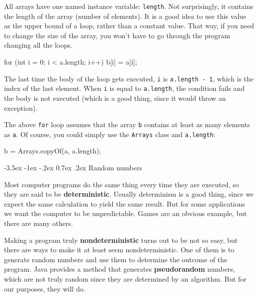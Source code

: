 \documentclass[12pt]{book}
\makeatletter
\theoremstyle{exercise}
\newcommand{\java}[1]{\verb"#1"}
\renewcommand{\section}{\@startsection {section}{1}{\z@}%
    {-3.5ex \@plus -1ex \@minus -.2ex}%
    {0.7ex \@plus.2ex}%
    {\normalfont\Large\bfseries}}
\newcommand{\java}[1]{\lstinline{#1}} %
\makeatother
\begin{document}


All arrays have one named instance variable: \java{length}.
Not surprisingly, it contains the length of the array (number of elements).
It is a good idea to use this value as the upper bound of a loop, rather than a constant value.
That way, if you need to change the size of the array, you won't have to go through the program changing all the loops.

\begin{code}
    for (int i = 0; i < a.length; i++) {
        b[i] = a[i];
    }
\end{code}

The last time the body of the loop gets executed, \java{i} is \java{a.length - 1}, which is the index of the last element.
When \java{i} is equal to \java{a.length}, the condition fails and the body is not executed (which is a good thing, since it would throw an exception).

The above \java{for} loop assumes that the array \java{b} contains at least as many elements as \java{a}.
Of course, you could simply use the \java{Arrays} class and \java{a.length}:

\begin{code}
    b = Arrays.copyOf(a, a.length);
\end{code}


\section{Random numbers}
\label{random}
\label{pseudorandom}


Most computer programs do the same thing every time they are executed, so they are said to be {\bf deterministic}.
Usually determinism is a good thing, since we expect the same calculation to yield the same result.
But for some applications we want the computer to be unpredictable.
Games are an obvious example, but there are many others.


Making a program truly {\bf nondeterministic} turns out to be not so easy, but there are ways to make it at least seem nondeterministic.
One of them is to generate random numbers and use them to determine the outcome of the program.
Java provides a method that generates {\bf pseudorandom} numbers, which are not truly random since they are determined by an algorithm.
But for our purposes, they will do.
\end{document}
